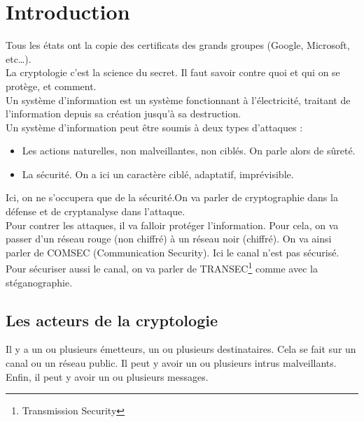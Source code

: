 \section{Introduction}
Tous les états ont la copie des certificats des grands groupes (Google, Microsoft, etc\ldots).\\
La cryptologie c'est la science du secret. Il faut savoir contre quoi et qui on se protège, et comment.\\
Un système d'information est un système fonctionnant à l'électricité, traitant de l'information depuis sa création jusqu'à sa destruction.\\
Un système d'information peut être soumis à deux types d'attaques :
\begin{itemize}
 \item Les actions naturelles, non malveillantes, non ciblés. On parle alors de sûreté.
 \item La sécurité. On a ici un caractère ciblé, adaptatif, imprévisible.
\end{itemize}
Ici, on ne s'occupera que de la sécurité.On va parler de cryptographie dans la défense et de cryptanalyse dans l'attaque.\\
Pour contrer les attaques, il va falloir protéger l'information. Pour cela, on va passer d'un réseau rouge (non chiffré) à un réseau noir (chiffré). On va ainsi parler de COMSEC (Communication Security). Ici le canal n'est pas sécurisé. Pour sécuriser aussi le canal, on va parler de TRANSEC\footnote{Transmission Security} comme avec la stéganographie.
\subsection{Les acteurs de la cryptologie}
Il y a un ou plusieurs émetteurs, un ou plusieurs destinataires. Cela se fait sur un canal ou un réseau public. Il peut y avoir un ou plusieurs intrus malveillants. Enfin, il peut y avoir un ou plusieurs messages.
